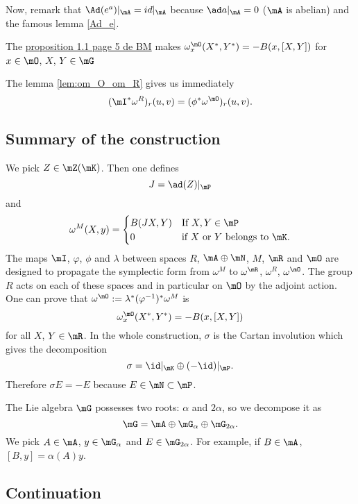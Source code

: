 Now, remark that $\Ad(e^a)|_{\mA}=id|_{\mA}$ because $\ad a|_{\mA}=0$ ($\mA$ is abelian) and 
the famous lemma \ref{Ad_e}.

The \underline{proposition 1.1 page 5 de BM} makes $\omega_x^{\mO}(X^*,Y^*)=-B(x,[X,Y])$ for $x\in\mO$, $X$, $Y\in\mG$

The lemma \ref{lem:om_O_om_R} gives us immediately 
\[
   (\mI^*\omega^R)_r(u,v)=(\phi^*\omega^{\mO})_r(u,v).
\]
\subsection{Summary of the construction}

We pick $Z\in\mZ(\mK)$. Then one defines
\[ 
  J=\ad(Z)|_{\mP}
\]
and 
\[ 
  \omega^M(X,y)=
\begin{cases}
 B(JX,Y)&\text{If $X,Y\in\mP$}\\
	0&\text{if $X$ or $Y$ belongs to $\mK$}.
\end{cases}
\]
The maps $\mI$, $\varphi$, $\phi$ and $\lambda$ between spaces $R$, $\mA\oplus\mN$, $M$, $\mR$ and $\mO$ are designed to propagate the symplectic form from $\omega^M$ to $\omega^{\mR}$, $\omega^R$, $\omega^{\mO}$. The group $R$ acts on each of these spaces and in particular on $\mO$ by the adjoint action. One can prove that $\omega^{\mO}:=\lambda^*(\varphi^{-1})^*\omega^M$ is
\[ 
  \omega^{\mO}_x(X^*,Y^*)=-B(x,[X,Y])
\]
for all $X$, $Y\in\mR$. In the whole construction, $\sigma$ is the Cartan involution which gives the decomposition
\[ 
  \sigma=\id|_{\mK}\oplus(-\id)|_{\mP}.
\]
Therefore $\sigma E=-E$ because $E\in\mN\subset\mP$.

The Lie algebra $\mG$ possesses two roots: $\alpha$ and $2\alpha$, so we decompose it as 
\[ 
  \mG=\mA\oplus\mG_{\alpha}\oplus\mG_{2\alpha}.
\]
We pick $A\in\mA$, $y\in\mG_{\alpha}$ and $E\in\mG_{2\alpha}$. For example, if $B\in \mA$, $[B,y]=\alpha(A)y$.

\subsection{Continuation}

